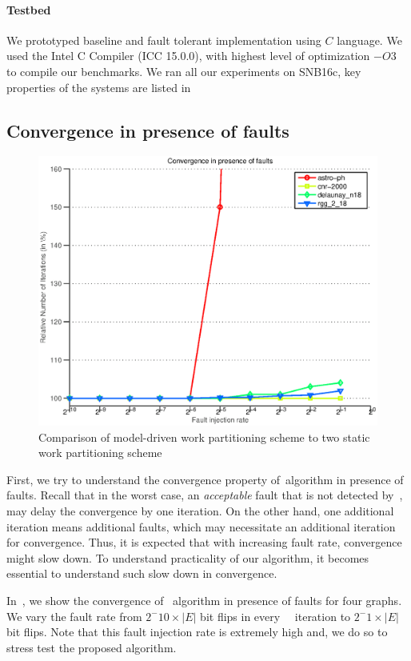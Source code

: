 \paragraph{Testbed}

We prototyped baseline and fault tolerant implementation using $C$ language. 
We used the Intel C Compiler (ICC 15.0.0), with highest level of
 optimization $-O3$ to compile our benchmarks.
We ran all our experiments on SNB16c, key properties of the systems are listed in~


\subsection{Convergence in presence of faults}

\begin{figure}[tbp]
\includegraphics[width=.5\textwidth]{plots/plot_conv.eps}
\caption{\label{fig:con-plot} 
\small Comparison of model-driven work partitioning scheme to
two static work partitioning scheme}
\end{figure}

First, we try to understand the convergence property of~\sv algorithm 
in presence of faults. 
Recall that in the worst case, an \emph{acceptable} fault that is not detected by~, may delay the convergence by one iteration. On the other hand, one additional iteration means additional faults, which may necessitate an additional iteration for convergence. 
Thus, it is expected that with increasing fault rate, convergence might slow down. To understand practicality of our algorithm, it becomes essential to understand such slow down in convergence.  

In~, we show the convergence of \sv~algorithm in presence of faults for four graphs. We vary the fault rate from $2^-{10} \times |E|$ bit flips in every~{\sv}~ iteration to $2^-{1} \times |E|$ bit flips. Note that this fault injection rate is extremely high and, we do so to stress test the proposed algorithm.

